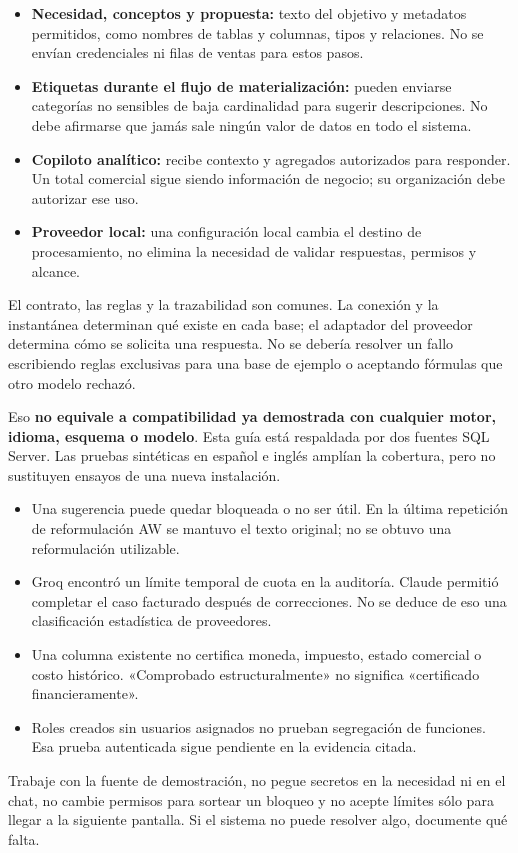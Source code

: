 \begin{itemize}
\item \textbf{Necesidad, conceptos y propuesta:} texto del objetivo y metadatos permitidos, como nombres de tablas y columnas, tipos y relaciones. No se envían credenciales ni filas de ventas para estos pasos.
\item \textbf{Etiquetas durante el flujo de materialización:} pueden enviarse categorías no sensibles de baja cardinalidad para sugerir descripciones. No debe afirmarse que jamás sale ningún valor de datos en todo el sistema.
\item \textbf{Copiloto analítico:} recibe contexto y agregados autorizados para responder. Un total comercial sigue siendo información de negocio; su organización debe autorizar ese uso.
\item \textbf{Proveedor local:} una configuración local cambia el destino de procesamiento, no elimina la necesidad de validar respuestas, permisos y alcance.
\end{itemize}
El contrato, las reglas y la trazabilidad son comunes. La conexión y la instantánea determinan qué existe en cada base; el adaptador del proveedor determina cómo se solicita una respuesta. No se debería resolver un fallo escribiendo reglas exclusivas para una base de ejemplo o aceptando fórmulas que otro modelo rechazó.

Eso \textbf{no equivale a compatibilidad ya demostrada con cualquier motor, idioma, esquema o modelo}. Esta guía está respaldada por dos fuentes SQL Server. Las pruebas sintéticas en español e inglés amplían la cobertura, pero no sustituyen ensayos de una nueva instalación.
\begin{itemize}
\item Una sugerencia puede quedar bloqueada o no ser útil. En la última repetición de reformulación AW se mantuvo el texto original; no se obtuvo una reformulación utilizable.
\item Groq encontró un límite temporal de cuota en la auditoría. Claude permitió completar el caso facturado después de correcciones. No se deduce de eso una clasificación estadística de proveedores.
\item Una columna existente no certifica moneda, impuesto, estado comercial o costo histórico. «Comprobado estructuralmente» no significa «certificado financieramente».
\item Roles creados sin usuarios asignados no prueban segregación de funciones. Esa prueba autenticada sigue pendiente en la evidencia citada.
\end{itemize}
\begin{good}
Trabaje con la fuente de demostración, no pegue secretos en la necesidad ni en el chat, no cambie permisos para sortear un bloqueo y no acepte límites sólo para llegar a la siguiente pantalla. Si el sistema no puede resolver algo, documente qué falta.
\end{good}
